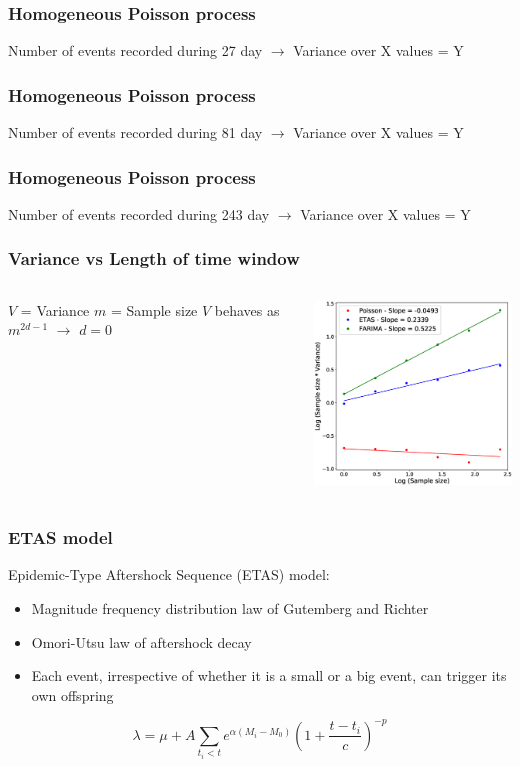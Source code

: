 \documentclass{beamer}
\begin{document}
	\begin{frame}
		\frametitle{Homogeneous Poisson process}
		Number of events recorded during 27 day $\rightarrow$ Variance over X values = Y
	\end{frame}

	\begin{frame}
		\frametitle{Homogeneous Poisson process}
		Number of events recorded during 81 day $\rightarrow$ Variance over X values = Y
	\end{frame}

	\begin{frame}
		\frametitle{Homogeneous Poisson process}
		Number of events recorded during 243 day $\rightarrow$ Variance over X values = Y
	\end{frame}

	\begin{frame}
		\frametitle{Variance vs Length of time window}
		\begin{columns}[c]
			\begin{column}{5cm}
				$V$ = Variance
				$m$ = Sample size
				$V$ behaves as $m^{2 d - 1}$
				$\rightarrow$ $d =  0$
			\end{column}
			\begin{column}{7cm}
				\begin{center}
					\includegraphics[width=7cm, trim={0cm 0cm 0cm 0cm}, clip]{other/comparison.eps}
				\end{center}
			\end{column}
		\end{columns}
	\end{frame}

	\begin{frame}
		\frametitle{ETAS model}
		Epidemic-Type Aftershock Sequence (ETAS) model:
		\begin{itemize}
			\item Magnitude frequency distribution law of Gutemberg and Richter
			\item Omori-Utsu law of aftershock decay
			\item Each event, irrespective of whether it is a small or a big event, can trigger its own offspring
		\end{itemize}
		\begin{equation}
		\lambda = \mu + A \sum_{t_i < t} e^{\alpha \left( M_i - M_0 \right)} \left( 1 + \frac{t - t_i}{c} \right) ^{-p}
		\end{equation}
	\end{frame}
\end{document}
